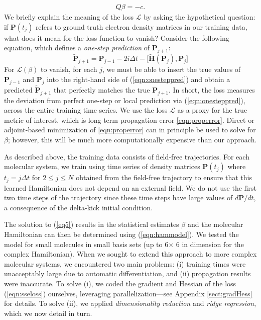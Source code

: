 \documentclass[10pt]{article}
\begin{document}
\begin{align}
    \label{eq5}
    Q \beta = -c.
\end{align}
We briefly explain the meaning of the loss $\mathcal{L}$ by asking the hypothetical question: if $\mathbf{P}(t_j)$ refers to ground truth electron density matrices in our training data, what does it mean for the loss function to vanish?  Consider the following equation, which defines a \emph{one-step prediction} of $\mathbf{P}_{j+1}$:
\begin{equation}
\label{eqn:onesteppred}
\widetilde{\mathbf{P}}_{j+1} = \mathbf{P}_{j-1} - 2 i \Delta t -  \big [   \widetilde{\mathbf{H}}(\mathbf{P}_j), \mathbf{P}_j \big]
\end{equation}
For $\mathcal{L}(\beta)$ to vanish, for each $j$, we must be able to insert the true values of $\mathbf{P}_{j-1}$ and $\mathbf{P}_{j}$ into the right-hand side of (\ref{eqn:onesteppred}) and obtain a predicted $\widetilde{\mathbf{P}}_{j+1}$ that perfectly matches the true $\mathbf{P}_{j+1}$.  In short, the loss measures the deviation from perfect one-step or local prediction via (\ref{eqn:onesteppred}), across the entire training time series. We use the loss $\mathcal{L}$ as a proxy for the true metric of interest, which is long-term propagation error \eqref{eqn:properror}.  Direct or adjoint-based minimization of \eqref{eqn:properror} can in principle be used to solve for $\beta$; however, this will be much more computationally expensive than our approach.

As described above, the training data consists of field-free trajectories.
For each molecular system, we train using time series of density matrices $\mathbf{P}(t_j)$ where $t_j = j\Delta t \text{ for } 2\leq j \leq N$ obtained from the field-free trajectory to ensure that this learned Hamiltonian does not depend on an external field. We do not use the first two time steps of the trajectory since these time steps have large values of ${d\mathbf{P}}/{dt}$, a consequence of the delta-kick initial condition.

The solution to  (\ref{eq5}) results in the statistical estimates $\beta$ and the molecular Hamiltonian can then be determined using (\ref{eqn:hammodel}). We tested the model for small molecules in small basis sets (up to 6$\times$ 6 in dimension for the complex Hamiltonian).  When we sought to extend this approach to more complex molecular systems, we encountered two main problems: (i) training times were unacceptably large due to automatic differentiation, and (ii) propagation results were inaccurate. To solve (i), we coded the gradient and Hessian of the loss (\ref{eqn:sseloss}) ourselves, leveraging parallelization---see Appendix \ref{sect:gradHess} for details.  To solve (ii), we applied  \emph{dimensionality reduction} and \emph{ridge regression}, which we now detail in turn.
\end{document}
